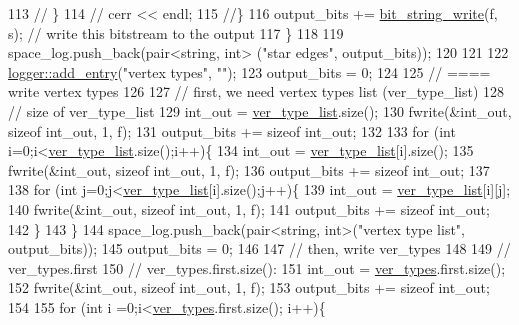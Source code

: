 \begin{DoxyCode}
113     \textcolor{comment}{//  \}}
114     \textcolor{comment}{//  cerr << endl;}
115     \textcolor{comment}{//\}}
116     output\_bits += \hyperlink{compression__helper_8cpp_a9a2fbdf1fe0e38f631e7e242a819883b}{bit\_string\_write}(f, s); \textcolor{comment}{// write this bitstream to the output}
117   \}
118 
119   space\_log.push\_back(pair<string, int> (\textcolor{stringliteral}{"star edges"}, output\_bits));
120 
121 
122   \hyperlink{classlogger_a710163deb17bc81f70d53d285b8ac9ac}{logger::add\_entry}(\textcolor{stringliteral}{"vertex types"}, \textcolor{stringliteral}{""});
123   output\_bits = 0;
124 
125   \textcolor{comment}{// ==== write vertex types}
126 
127   \textcolor{comment}{// first, we need vertex types list (ver\_type\_list)}
128   \textcolor{comment}{// size of ver\_type\_list}
129   int\_out = \hyperlink{classmarked__graph__compressed_af2e3e55223d436628a02758dfae88493}{ver\_type\_list}.size();
130   fwrite(&int\_out, \textcolor{keyword}{sizeof} int\_out, 1, f);
131   output\_bits += \textcolor{keyword}{sizeof} int\_out;
132 
133   \textcolor{keywordflow}{for} (\textcolor{keywordtype}{int} i=0;i<\hyperlink{classmarked__graph__compressed_af2e3e55223d436628a02758dfae88493}{ver\_type\_list}.size();i++)\{
134     int\_out = \hyperlink{classmarked__graph__compressed_af2e3e55223d436628a02758dfae88493}{ver\_type\_list}[i].size();
135     fwrite(&int\_out, \textcolor{keyword}{sizeof} int\_out, 1, f);
136     output\_bits += \textcolor{keyword}{sizeof} int\_out;
137 
138     \textcolor{keywordflow}{for} (\textcolor{keywordtype}{int} j=0;j<\hyperlink{classmarked__graph__compressed_af2e3e55223d436628a02758dfae88493}{ver\_type\_list}[i].size();j++)\{
139       int\_out = \hyperlink{classmarked__graph__compressed_af2e3e55223d436628a02758dfae88493}{ver\_type\_list}[i][j];
140       fwrite(&int\_out, \textcolor{keyword}{sizeof} int\_out, 1, f);
141       output\_bits += \textcolor{keyword}{sizeof} int\_out;
142     \}
143   \}
144   space\_log.push\_back(pair<string, int>(\textcolor{stringliteral}{"vertex type list"}, output\_bits));
145   output\_bits = 0;
146   
147   \textcolor{comment}{// then, write ver\_types}
148 
149   \textcolor{comment}{// ver\_types.first}
150   \textcolor{comment}{// ver\_types.first.size():}
151   int\_out = \hyperlink{classmarked__graph__compressed_af446cc5e23c241a92b76642fd5ebc403}{ver\_types}.first.size();
152   fwrite(&int\_out, \textcolor{keyword}{sizeof} int\_out, 1, f);
153   output\_bits += \textcolor{keyword}{sizeof} int\_out;
154 
155   \textcolor{keywordflow}{for} (\textcolor{keywordtype}{int} i =0;i<\hyperlink{classmarked__graph__compressed_af446cc5e23c241a92b76642fd5ebc403}{ver\_types}.first.size(); i++)\{

\end{DoxyCode}
